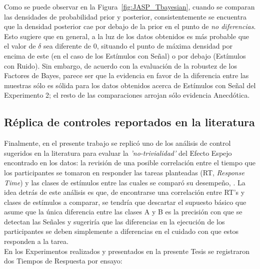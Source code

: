 Como se puede observar en la Figura~\ref{fig:JASP_Tbayesian}, cuando se comparan las densidades de probabilidad prior y posterior, consistentemente se encuentra que la densidad posterior cae por debajo de la prior en el punto de \textit{no diferencias}. Esto sugiere que en general, a la luz de los datos obtenidos es más probable que el valor de $\delta$ sea diferente de $0$, situando el punto de máxima densidad por encima de este (en el caso de los Estímulos con Señal) o por debajo (Estímulos con Ruido). Sin embargo, de acuerdo con la evaluación de la robustez de los Factores de Bayes, parece ser que la evidencia en favor de la diferencia entre las muestras sólo es sólida para los datos obtenidos acerca de Estímulos con Señal del Experimento 2; el resto de las comparaciones arrojan sólo evidencia Anecdótica.\\















\subsection{Réplica de controles reportados en la literatura}

Finalmente, en el presente trabajo se replicó uno de los análisis de control sugeridos en la literatura para evaluar la \textit{'no-trivialidad'} del Efecto Espejo encontrado en los datos: la revisión de una posible correlación entre el tiempo que los participantes se tomaron en responder las tareas planteadas (RT, \textit{Response Time}) y las clases de estímulos entre las cuales se comparó su desempeño, \parencite{Glanzer1990}. La idea detrás de este análisis es que, de encontrarse una correlación entre RT's y clases de estímulos a comparar, se tendría que descartar el supuesto básico que asume que la única diferencia entre las clases A y B es la precisión con que se detectan las Señales y sugeriría que las diferencias en la ejecución de los participantes se deben simplemente a diferencias en el cuidado con que estos responden a la tarea.\\

En los Experimentos realizados y presentados en la presente Tesis se registraron dos Tiempos de Respuesta por ensayo:\\

